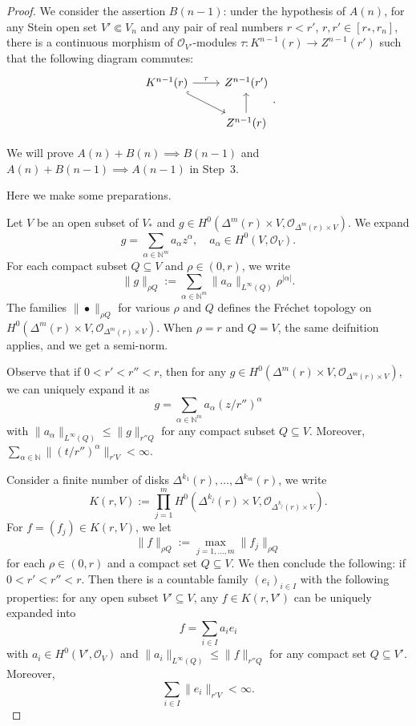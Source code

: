 \begin{proof}
    We consider the assertion $B(n-1)$: under the hypothesis of $A(n)$, for any Stein open set $V'\Subset V_n$ and any pair of real numbers $r<r'$, $r,r'\in [r_*,r_n]$, there is a continuous morphism of $\mathcal{O}_{V'}$-modules $\tau:K^{n-1}(r)\rightarrow Z^{n-1}(r')$ such that the following diagram commutes:
    \[
        \begin{tikzcd}
            K^{n-1}(r) \arrow[rd, hook] \arrow[r, "\tau"] & Z^{n-1}(r')          \\
                                                          & Z^{n-1}(r) \arrow[u]
            \end{tikzcd}.
    \]

    We will prove $A(n)+B(n)\implies B(n-1)$ and $A(n)+B(n-1)\implies A(n-1)$ in Step~3.
    
    Here we make some preparations. 

    Let $V$ be an open subset of $V_*$ and $g\in H^0(\Delta^m(r)\times V,\mathcal{O}_{\Delta^m(r)\times V})$. We expand
    \[
        g=\sum_{\alpha\in \mathbb{N}^m} a_{\alpha}z^{\alpha},\quad a_{\alpha}\in H^0(V,\mathcal{O}_V).
    \]
    For each compact subset $Q\subseteq V$ and $\rho\in (0,r)$, we write
    \[
        \|g\|_{\rho Q}:=\sum_{\alpha\in \mathbb{N}^m}\|a_{\alpha}\|_{L^{\infty}(Q)}\rho^{|\alpha|}.
    \]
    The families $\|\bullet\|_{\rho Q}$ for various $\rho$ and $Q$ defines the Fréchet topology on $H^0(\Delta^m(r)\times V,\mathcal{O}_{\Delta^m(r)\times V})$. When $\rho=r$ and $Q=V$, the same deifnition applies, and we get a semi-norm.

    Observe that if $0<r'<r''<r$, then for any $g\in H^0(\Delta^m(r)\times V,\mathcal{O}_{\Delta^m(r)\times V})$, we can uniquely expand it as 
    \[
            g=\sum_{\alpha\in \mathbb{N}^m}a_{\alpha}(z/r'')^\alpha
    \]
    with $\|a_{\alpha}\|_{L^{\infty}(Q)}\leq \|g\|_{r''Q}$ for any compact subset $Q\subseteq V$. Moreover, $\sum_{\alpha\in \mathbb{N}} \|(t/r'')^{\alpha}\|_{r'V}<\infty$.

    Consider a finite number of disks $\Delta^{k_1}(r),\ldots,\Delta^{k_m}(r)$, we write
    \[
            K(r,V):=\prod_{j=1}^m H^0(\Delta^{k_j}(r)\times V,\mathcal{O}_{\Delta^{k_j}(r)\times V}).
    \]
    For $f=(f_j)\in K(r,V)$, we let
    \[
            \|f\|_{\rho Q}:=\max_{j=1,\ldots,m} \|f_j\|_{\rho Q}
    \]
    for each $\rho\in (0,r)$ and a compact set $Q\subseteq V$. We then conclude the following: if $0<r'<r''<r$. Then there is a countable family $(e_i)_{i\in I}$ with the following properties: for any open subset $V'\subseteq V$, any $f\in K(r,V')$ can be uniquely expanded into 
    \[
            f=\sum_{i\in I}a_i e_i
    \]
    with $a_i\in H^0(V',\mathcal{O}_V)$ and $\|a_i\|_{L^{\infty}(Q)}\leq \|f\|_{r'' Q}$ for any compact set $Q\subseteq V'$. Moreover,
    \[
            \sum_{i\in I}\|e_i\|_{r'V}<\infty.
    \]


\end{proof}

